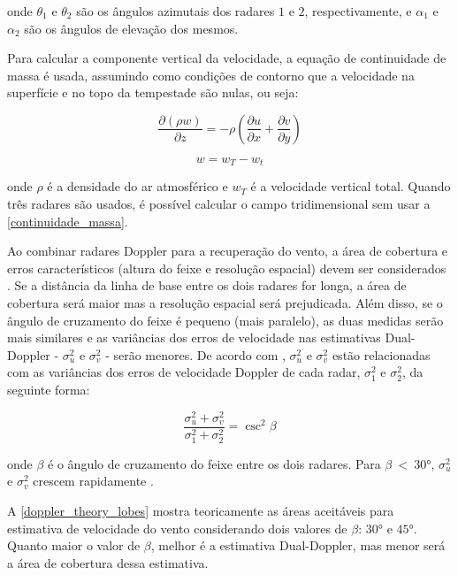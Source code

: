 \noindent
onde $\theta_1$ e $\theta_2$ são os ângulos azimutais dos radares $1$ e $2$, respectivamente, e $\alpha_1$ e $\alpha_2$ são os ângulos de elevação dos mesmos.

Para calcular a componente vertical da velocidade, a equação de continuidade de massa é usada, assumindo como condições de contorno que a velocidade na superfície e no topo da tempestade são nulas, ou seja:

\begin{equation} 
\label{continuidade_massa}
\frac{\partial(\rho w)}{\partial z}=-\rho\left(\frac{\partial u}{\partial x} + \frac{\partial v}{\partial y}\right)
\end{equation}

\begin{equation}
w=w_T-w_t
\end{equation}

\noindent
onde $\rho$ é a densidade do ar atmosférico e $w_T$ é a velocidade vertical total. Quando três radares são usados, é possível calcular o campo tridimensional sem usar a \autoref{continuidade_massa}.

Ao combinar radares Doppler para a recuperação do vento, a área de cobertura e erros característicos (altura do feixe e resolução espacial) devem ser considerados \cite{Dolan2007}. Se a distância da linha de base entre os dois radares for longa, a área de cobertura será maior mas a resolução espacial será prejudicada. Além disso, se o ângulo de cruzamento do feixe é pequeno (mais paralelo), as duas medidas serão mais similares e as variâncias dos erros de velocidade nas estimativas Dual-Doppler - $\sigma_u^2$ e $\sigma_v^2$ - serão menores. De acordo com , $\sigma_u^2$ e $\sigma_v^2$ estão relacionadas com as variâncias dos erros de velocidade Doppler de cada radar, $\sigma_1^2$ e $\sigma_2^2$, da seguinte forma:

\begin{equation}
\frac{\sigma_u^2+ \sigma_v^2}{\sigma_1^2 + \sigma_2^2}=\csc^2{\beta}
\end{equation}

\noindent
onde $\beta$ é o ângulo de cruzamento do feixe entre os dois radares. Para $\beta\:<\:\ang{30}$, $\sigma_u^2$ e $\sigma_v^2$ crescem rapidamente \cite{Doviak1976, Davies-Jones1979, Doviak1993}.

A \autoref{doppler_theory_lobes} mostra teoricamente as áreas aceitáveis para estimativa de velocidade do vento considerando dois valores de $\beta$: $\ang{30}$ e $\ang{45}$. Quanto maior o valor de $\beta$, melhor é a estimativa Dual-Doppler, mas menor será a área de cobertura dessa estimativa.

